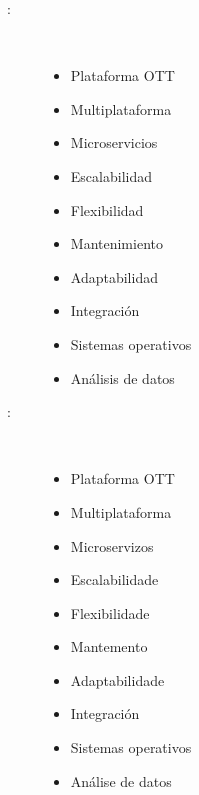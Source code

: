 \begin{multicols}{2}
\begin{description}
\item [\palabraschaveprincipal:] \mbox{} \\[-20pt]
  \begin{itemize}
    \item Plataforma OTT
    \item Multiplataforma
    \item Microservicios
    \item Escalabilidad
    \item Flexibilidad
    \item Mantenimiento
    \item Adaptabilidad
    \item Integración
    \item Sistemas operativos
    \item Análisis de datos
  \end{itemize}
\end{description}
\begin{description}
\item [\palabraschavesecundaria:] \mbox{} \\[-20pt]
\begin{itemize} 
  \item Plataforma OTT 
  \item Multiplataforma 
  \item Microservizos 
  \item Escalabilidade 
  \item Flexibilidade 
  \item Mantemento 
  \item Adaptabilidade 
  \item Integración 
  \item Sistemas operativos 
  \item Análise de datos 
\end{itemize}
\end{description}
\end{multicols}
